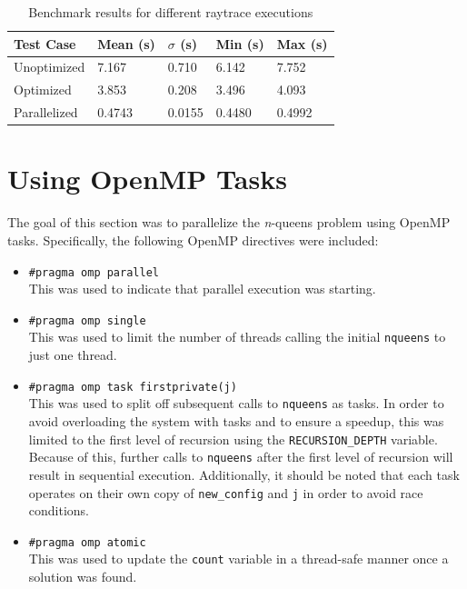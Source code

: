 \documentclass[12pt,reqno]{article}
\begin{document}
\begin{table}[H]
    \centering
    \caption{Benchmark results for different raytrace executions}
    \label{tab:raytrace-results}
    \begin{tabular}{|P{2.5cm}|P{2.5cm}|P{2.5cm}|P{2.5cm}|P{2.5cm}|}
    \hline
    \textbf{Test Case}& \textbf{Mean (s)} & \textbf{$\sigma$ (s)} & \textbf{Min (s)} & \textbf{Max (s)}\\ \hline 
    Unoptimized & 7.167 & 0.710 & 6.142 & 7.752 \\ \hline
    Optimized & 3.853 & 0.208 & 3.496 & 4.093 \\ \hline
    Parallelized & 0.4743 & 0.0155 & 0.4480 & 0.4992 \\ \hline
    \end{tabular}
\end{table}

\pagebreak


\section*{Using OpenMP Tasks}
The goal of this section was to parallelize the \textit{n}-queens problem using OpenMP tasks. Specifically, the following OpenMP directives were included:
\begin{itemize}
    \item \texttt{\#pragma omp parallel} \\
    This was used to indicate that parallel execution was starting.
    \item \texttt{\#pragma omp single} \\
    This was used to limit the number of threads calling the initial \texttt{nqueens} to just one thread.
    \item \texttt{\#pragma omp task firstprivate(j)} \\ 
    This was used to split off subsequent calls to \texttt{nqueens} as tasks. In order to avoid overloading the system with tasks and to ensure a speedup, this was limited to the first level of recursion using the \texttt{RECURSION\_DEPTH} variable. Because of this, further calls to \texttt{nqueens} after the first level of recursion will result in sequential execution. Additionally, it should be noted that each task operates on their own copy of \texttt{new\_config} and \texttt{j} in order to avoid race conditions.
    \item \texttt{\#pragma omp atomic} \\
    This was used to update the \texttt{count} variable in a thread-safe manner once a solution was found. 
\end{itemize}
\end{document}
